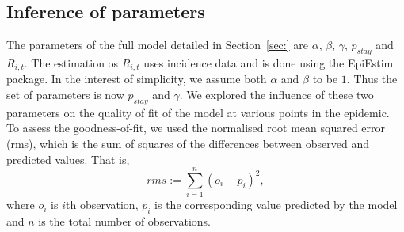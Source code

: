 \documentclass[11pt,]{article}
\begin{document}
\subsection{Inference of parameters}

The parameters of the full model detailed in Section~\ref{sec:} are
$\alpha$, $\beta$, $\gamma$, $p_{stay}$ and $R_{i, t}$. The
estimation os $R_{i, t}$ uses incidence data and is done using the
EpiEstim package. In the interest of simplicity, we assume both
$\alpha$ and $\beta$ to be $1$. Thus the set of parameters is now
$p_{stay}$ and $\gamma$. We explored the influence of these two
parameters on the quality of fit of the model at various points in the
epidemic. To assess the goodness-of-fit, we used the normalised root mean squared
error (rms), which is the sum of squares of the differences between
observed and predicted values. That is, 
\[ rms := \sum_{i = 1}^n{\left(o_i - p_i\right)^2},\]
where $o_i$ is $i$th observation, $p_i$ is the corresponding value
predicted by the model and $n$ is the total number of observations.
\end{document}
